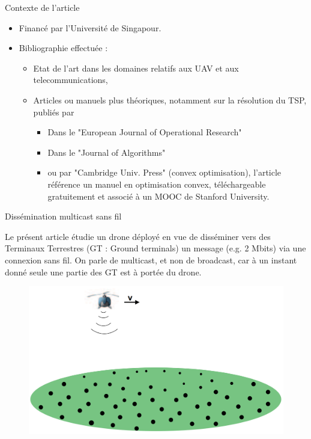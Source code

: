 \begin{frame}{Contexte de l'article}
\begin{itemize}
	\item Financé par l'Université de Singapour.

	\item Bibliographie effectuée : 
	\begin{itemize}
		\item Etat de l'art dans les domaines relatifs aux UAV et aux telecommunications, 
		\item Articles ou manuels plus théoriques, notamment sur la résolution du TSP, publiés par 
 			\begin{itemize}
 				\item  Dans le "European Journal of Operational Research"
 				\item  Dans le "Journal of Algorithms"
 				\item  ou par "Cambridge Univ. Press" (convex optimisation), l'article référence un manuel
 				en optimisation convex, téléchargeable gratuitement et associé à un MOOC de Stanford University.
 			\end{itemize}
	\end{itemize}


\end{itemize}
\end{frame}
 
\begin{frame}{Dissémination multicast sans fil}

Le présent article étudie un drone déployé en vue de disséminer vers des Terminaux Terrestres (GT : Ground terminals) un message (e.g. 2 Mbits) via une connexion sans fil. On parle de multicast, et non de broadcast, car à un instant donné seule une partie des GT est à portée du drone.

\begin{figure}
	\centering
	\includegraphics[width=0.7\linewidth]{images/multicast}
	\caption{}
	\label{fig:multicast}
\end{figure}

\end{frame}


